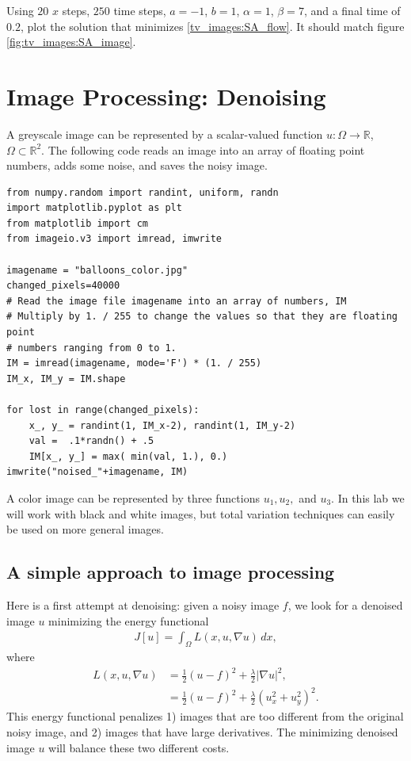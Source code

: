 \begin{problem}
Using $20$ $x$ steps, $250$ time steps, $a=-1$, $b=1$, $\alpha = 1$, $\beta=7$, and a final time of $0.2$, plot the solution that minimizes \eqref{tv_images:SA_flow}.
It should match figure \ref{fig:tv_images:SA_image}.

\end{problem}

\section*{Image Processing: Denoising}

A greyscale image can be represented by a scalar-valued function $u:\Omega \to \mathbb{R}$, $\Omega \subset \mathbb{R}^2$. The following code reads an image into an array of floating point numbers, adds some noise, and saves the noisy image.
\begin{lstlisting}
from numpy.random import randint, uniform, randn
import matplotlib.pyplot as plt
from matplotlib import cm
from imageio.v3 import imread, imwrite

imagename = "balloons_color.jpg"
changed_pixels=40000
# Read the image file imagename into an array of numbers, IM
# Multiply by 1. / 255 to change the values so that they are floating point
# numbers ranging from 0 to 1.
IM = imread(imagename, mode='F') * (1. / 255)
IM_x, IM_y = IM.shape

for lost in range(changed_pixels):
    x_, y_ = randint(1, IM_x-2), randint(1, IM_y-2)
    val =  .1*randn() + .5
    IM[x_, y_] = max( min(val, 1.), 0.)
imwrite("noised_"+imagename, IM)
\end{lstlisting}
A color image can be represented by three functions $u_1, u_2,$ and $u_3$. In this lab we will work with black and white images, but total variation techniques can easily be used on more general images.

\subsection*{A simple approach to image processing}
Here is a first attempt at denoising: given a noisy image $f$, we look for a denoised image $u$ minimizing the energy functional
\begin{align}
J[u] = \int_{\Omega} L(x,u,\nabla u) \, dx, \label{tv_images:diffusion}
\end{align}
where
\begin{align*}
L(x,u,\nabla u) &= \frac{1}{2}(u-f)^2 + \frac{\lambda}{2} | \nabla u|^2,\\
&= \frac{1}{2}(u-f)^2 + \frac{\lambda}{2} (u_x^2 + u_y^2)^2.
\end{align*}
This energy functional penalizes 1) images that are too different from the original noisy image, and 2) images that have large derivatives. The minimizing denoised image $u$ will balance these two different costs.

